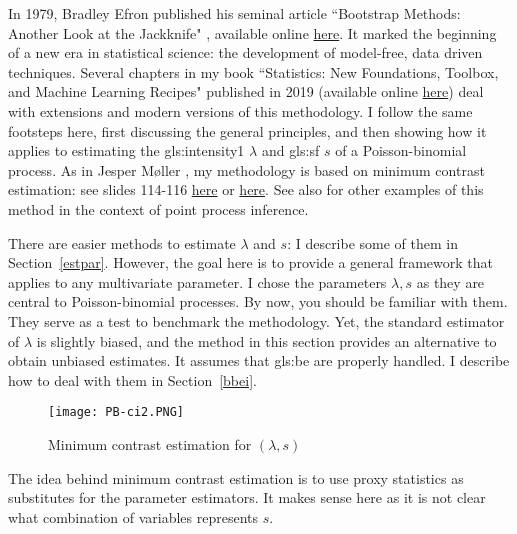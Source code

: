 \documentclass[10pt]{article}
\begin{document}
In 1979, Bradley Efron published his seminal article ``Bootstrap Methods: Another Look at the Jackknife"
\cite{be1979},
available
online \href{https://projecteuclid.org/journals/annals-of-statistics/volume-7/issue-1/Bootstrap-Methods-Another-Look-at-the-Jackknife/10.1214/aos/1176344552.full}{here}.
It marked the beginning of a new era in statistical science: the development of model-free, data driven techniques. Several chapters in my book
  ``Statistics: New Foundations, Toolbox, and Machine Learning Recipes" \cite{vgstats} published in 2019
 (available online \href{https://github.com/VincentGranville/Machine-Learning}{here})
  deal with extensions and modern versions of this methodology. I follow the same footsteps here, first discussing the general principles, and then showing how it applies
  to estimating the
\gls{gls:intensity1} $\lambda$ and
\gls{gls:sf} $s$
of a Poisson-binomial process. As in
Jesper Møller \cite{momo55}, my methodology is based on
\textcolor{index}{minimum contrast estimation}: see slides 114-116 \href{https://cimpatogo2018.sciencesconf.org/data/pages/Handout_Moller_CIMPA_Togo_2018.pdf}{here} or
\href{https://drive.google.com/file/d/1y5TZXvAL8fP9G5UkmV3npKgoVB0YWtXk/view?usp=sharing}{here}. See also \cite{hghf} for other examples of this method in the
context of point process inference.

There are easier methods to estimate $\lambda$ and $s$: I describe some of them in Section~\ref{estpar}. However, the goal here
is to provide a general framework that applies to any multivariate parameter. I chose the parameters $\lambda,s$ as they are central to Poisson-binomial processes. By now,
you should be familiar with them. They serve as a test to benchmark the methodology. Yet, the standard estimator of $\lambda$ is slightly biased, and the method in this section provides
an alternative to obtain unbiased estimates. It assumes that \gls{gls:be} are properly handled. I describe how to deal with them
in Section~\ref{bbei}.


\begin{figure}[H]
\centering
\texttt{[image: PB-ci2.PNG]}
\caption{Minimum contrast estimation for $(\lambda,s)$}
\label{fig:pbci}
\end{figure}

The idea behind minimum contrast estimation is to use proxy statistics as substitutes for the parameter estimators. It makes sense here as it is not clear what
combination of variables represents $s$.
\end{document}
